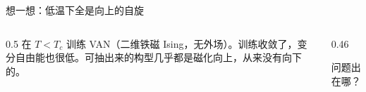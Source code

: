 \documentclass[aspectratio=169,10pt,UTF8,fontset=none]{ctexbeamer}
\begin{document}
\newcommand{\spintile}[2]{%
  \begin{scope}[shift={#1}]
    \fill[GTeal!75] (0,0) rectangle (12,12);
    \foreach \r/\c in {#2}{\fill[GOrange] (\c*2,\r*2) rectangle ++(2,2);}
    \draw[GSlate!50] (0,0) rectangle (12,12);
  \end{scope}}

\begin{frame}{想一想：低温下全是向上的自旋}
  \begin{columns}[c]
    \begin{column}{0.5\textwidth}
      在 $T<T_c$ 训练 VAN（二维铁磁 Ising，无外场）。训练收敛了，变分自由能也很低。可抽出来的构型几乎都是磁化向上，从来没有向下的。
      \par\vspace{4mm}
      \centering
    \end{column}
    \begin{column}{0.46\textwidth}
      \begin{hook}
        问题出在哪？
        \par\medskip
      \end{hook}
    \end{column}
  \end{columns}
\end{frame}
\end{document}
